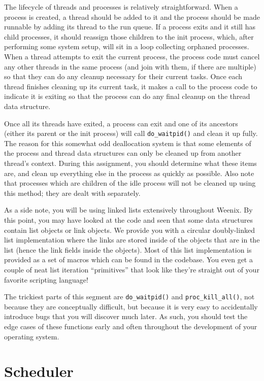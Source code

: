 The lifecycle of threads and processes is relatively straightforward. When a process is created, a thread should be added to it and the process should be made runnable by adding its thread to the run queue. If a process exits and it still has child processes, it should reassign those children to the init process, which, after performing some system setup, will sit in a loop collecting orphaned processes. When a thread attempts to exit the current process, the process code must cancel any other threads in the same process (and join with them, if there are multiple) so that they can do any cleanup necessary for their current tasks. Once each thread finishes cleaning up its current task, it makes a call to the process code to indicate it is exiting so that the process can do any final cleanup on the thread data structure.

Once all its threads have exited, a process can exit and one of its ancestors (either its parent or the init process) will call \texttt{do\_waitpid()} and clean it up fully. The reason for this somewhat odd deallocation system is that some elements of the process and thread data structures can only be cleaned up from another thread's context. During this assignment, you should determine what these items are, and clean up everything else in the process as quickly as possible. Also note that processes which are children of the idle process will not be cleaned up using this method; they are dealt with separately.

As a side note, you will be using linked lists extensively throughout Weenix. By this point, you may have looked at the code and seen that some data structures contain list objects or link objects. We provide you with a circular doubly-linked list implementation where the links are stored inside of the objects that are in the list (hence the link fields inside the objects). Most of this list implementation is provided as a set of macros which can be found in the codebase. You even get a couple of neat list iteration ``primitives'' that look like they're straight out of your favorite scripting language!

The trickiest parts of this segment are \texttt{do\_waitpid()} and \texttt{proc\_kill\_all()}, not because they are conceptually difficult, but because it is very easy to accidentally introduce bugs that you will discover much later. As such, you should test the edge cases of these functions early and often throughout the development of your operating system.

\section{Scheduler}

